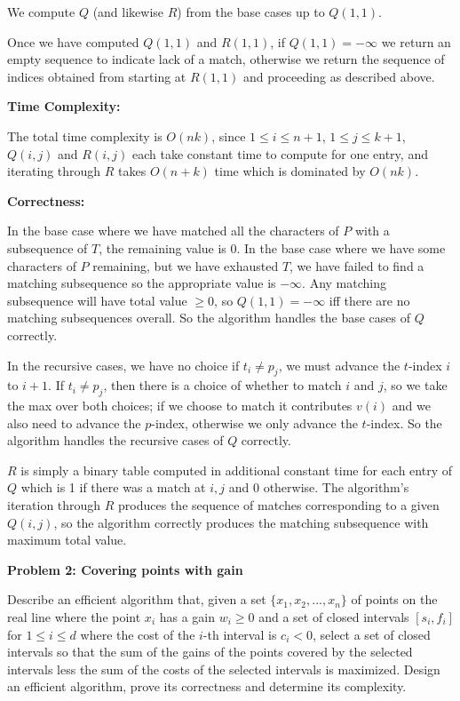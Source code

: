 \documentclass[letterpaper,12pt]{article}
\begin{document}
We compute $Q$ (and likewise $R$) from the base cases up to $Q(1,1)$.

Once we have computed $Q(1,1)$ and $R(1,1)$, if $Q(1,1) = -\infty$ we return an empty
sequence to indicate lack of a match, otherwise we return the sequence of
indices obtained from starting at $R(1,1)$ and proceeding as described above.

\vspace{2mm}
\textbf{Time Complexity:}

The total time complexity is $O(nk)$, since $1 \leq i \leq n + 1$, $1 \leq j \leq k + 1$,
$Q(i,j)$ and $R(i,j)$ each take constant time to compute for one entry, and
iterating through $R$ takes $O(n+k)$ time which is dominated by $O(nk)$.

\pagebreak

\vspace{2mm}
\textbf{Correctness:}

In the base case where we have matched all the characters of $P$ with a
subsequence of $T$, the remaining value is 0. In the base case where we have
some characters of $P$ remaining, but we have exhausted $T$, we have failed to
find a matching subsequence so the appropriate value is $-\infty$. Any matching
subsequence will have total value $\geq 0$, so $Q(1,1) = -\infty$ iff there are no
matching subsequences overall. So the algorithm handles the base cases of $Q$
correctly.

In the recursive cases, we have no choice if $t_i \neq p_j$, we must advance the
$t$-index $i$ to $i+1$. If $t_i \neq p_j$, then there is a choice of whether to
match $i$ and $j$, so we take the max over both choices; if we choose to match
it contributes $v(i)$ and we also need to advance the $p$-index, otherwise we
only advance the $t$-index. So the algorithm handles the recursive cases of $Q$
correctly.

$R$ is simply a binary table computed in additional constant time for each entry
of $Q$ which is 1 if there was a match at $i,j$ and 0 otherwise. The algorithm's
iteration through $R$ produces the sequence of matches corresponding to a given
$Q(i,j)$, so the algorithm correctly produces the matching subsequence with
maximum total value.

\pagebreak

\noindent\textbf{Problem 2: Covering points with gain}

Describe an efficient algorithm that, given a set $\{x_1,x_2,...,x_n\}$ of
points on the real line where the point $x_i$ has a gain $w_i \geq 0$ and a set of
closed intervals $[s_i, f_i]$ for $1 \leq i \leq d$ where the cost of the $i$-th
interval is $c_i < 0$, select a set of closed intervals so that the sum of the
gains of the points covered by the selected intervals less the sum of the costs
of the selected intervals is maximized. Design an efficient algorithm, prove its
correctness and determine its complexity.
\end{document}
